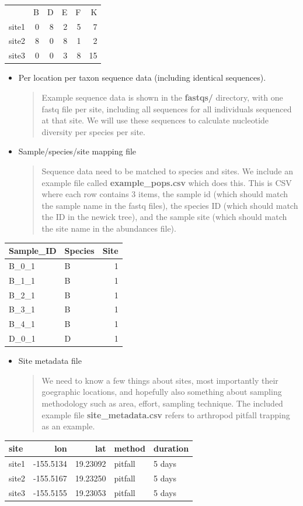 \documentclass[]{article}
\begin{document}
\begin{longtable}[]{@{}lrrrrr@{}}
& B & D & E & F & K\tabularnewline
site1 & 0 & 8 & 2 & 5 & 7\tabularnewline
site2 & 8 & 0 & 8 & 1 & 2\tabularnewline
site3 & 0 & 0 & 3 & 8 & 15\tabularnewline
\end{longtable}

\begin{itemize}
\item
  Per location per taxon sequence data (including identical sequences).

  \begin{quote}
  Example sequence data is shown in the \textbf{fastqs/} directory, with
  one fastq file per site, including all sequences for all individuals
  sequenced at that site. We will use these sequences to calculate
  nucleotide diversity per species per site.
  \end{quote}
\item
  Sample/species/site mapping file

  \begin{quote}
  Sequence data need to be matched to species and sites. We include an
  example file called \textbf{example\_pops.csv} which does this. This
  is CSV where each row contains 3 items, the sample id (which should
  match the sample name in the fastq files), the species ID (which
  should match the ID in the newick tree), and the sample site (which
  should match the site name in the abundances file).
  \end{quote}
\end{itemize}

\begin{longtable}[]{@{}llr@{}}
\toprule
Sample\_ID & Species & Site\tabularnewline
\midrule
\endhead
B\_0\_1 & B & 1\tabularnewline
B\_1\_1 & B & 1\tabularnewline
B\_2\_1 & B & 1\tabularnewline
B\_3\_1 & B & 1\tabularnewline
B\_4\_1 & B & 1\tabularnewline
D\_0\_1 & D & 1\tabularnewline
\bottomrule
\end{longtable}

\begin{itemize}
\item
  Site metadata file

  \begin{quote}
  We need to know a few things about sites, most importantly their
  goegraphic locations, and hopefully also something about sampling
  methodology such as area, effort, sampling technique. The included
  example file \textbf{site\_metadata.csv} refers to arthropod pitfall
  trapping as an example.
  \end{quote}
\end{itemize}

\begin{longtable}[]{@{}lrrll@{}}
\toprule
site & lon & lat & method & duration\tabularnewline
\midrule
\endhead
site1 & -155.5134 & 19.23092 & pitfall & 5 days\tabularnewline
site2 & -155.5167 & 19.23250 & pitfall & 5 days\tabularnewline
site3 & -155.5155 & 19.23053 & pitfall & 5 days\tabularnewline
\bottomrule
\end{longtable}
\end{document}
